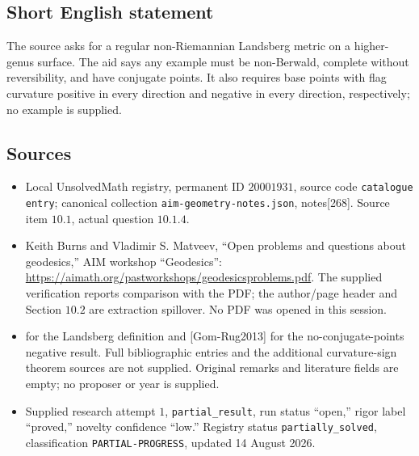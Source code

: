 \documentclass[11pt]{article}
\begin{document}
\subsection{Short English statement}
The source asks for a regular non-Riemannian Landsberg metric on a higher-genus surface. The aid says any example must be non-Berwald, complete without reversibility, and have conjugate points. It also requires base points with flag curvature positive in every direction and negative in every direction, respectively; no example is supplied.
\subsection{Sources}
\begin{itemize}
\item Local UnsolvedMath registry, permanent ID \(20001931\), source code \texttt{catalogue entry}; canonical collection \texttt{aim-geometry-notes.json}, notes[268]. Source item \(10.1\), actual question \(10.1.4\).
\item Keith Burns and Vladimir S. Matveev, ``Open problems and questions about geodesics,'' AIM workshop ``Geodesics'': \url{https://aimath.org/pastworkshops/geodesicsproblems.pdf}. The supplied verification reports comparison with the PDF; the author/page header and Section \(10.2\) are extraction spillover. No PDF was opened in this session.
\item [Bao2007] for the Landsberg definition and [Gom-Rug2013] for the no-conjugate-points negative result. Full bibliographic entries and the additional curvature-sign theorem sources are not supplied. Original remarks and literature fields are empty; no proposer or year is supplied.
\item Supplied research attempt \(1\), \texttt{partial\_result}, run status ``open,'' rigor label ``proved,'' novelty confidence ``low.'' Registry status \texttt{partially\_solved}, classification \texttt{PARTIAL-PROGRESS}, updated 14 August 2026.
\end{itemize}
\end{document}
